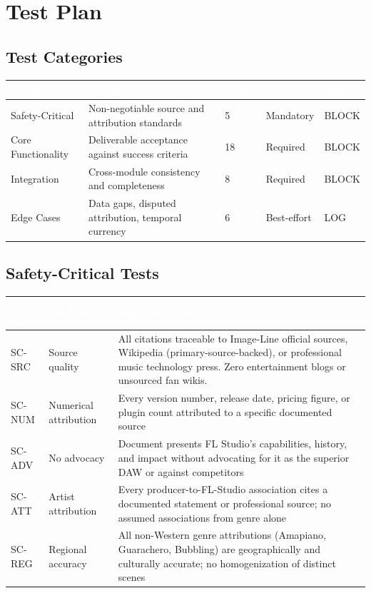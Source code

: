 \documentclass[11pt,letterpaper]{article}
\newcommand{\tableheader}[1]{\textbf{\sffamily\textcolor{white}{#1}}}
\begin{document}
\section{Test Plan}

\subsection{Test Categories}

\begin{center}
\begin{tabularx}{\textwidth}{L{3.5cm}XC{2cm}C{2cm}C{1.5cm}}
\toprule
{}
\tableheader{Category} & \tableheader{Purpose} & \tableheader{Count} & \tableheader{Priority} & \tableheader{Failure} \\
\midrule
Safety-Critical & Non-negotiable source and attribution standards & 5 & Mandatory & BLOCK \\
Core Functionality & Deliverable acceptance against success criteria & 18 & Required & BLOCK \\
Integration & Cross-module consistency and completeness & 8 & Required & BLOCK \\
Edge Cases & Data gaps, disputed attribution, temporal currency & 6 & Best-effort & LOG \\
\bottomrule
\end{tabularx}
\end{center}

\subsection{Safety-Critical Tests}

\begin{center}
\begin{tabularx}{\textwidth}{C{1.5cm}L{3.5cm}X}
\toprule
{}
\tableheader{Test ID} & \tableheader{Verifies} & \tableheader{Expected Behavior} \\
\midrule
SC-SRC & Source quality & All citations traceable to Image-Line official sources, Wikipedia (primary-source-backed), or professional music technology press. Zero entertainment blogs or unsourced fan wikis. \\
SC-NUM & Numerical attribution & Every version number, release date, pricing figure, or plugin count attributed to a specific documented source \\
SC-ADV & No advocacy & Document presents FL Studio's capabilities, history, and impact without advocating for it as the superior DAW or against competitors \\
SC-ATT & Artist attribution & Every producer-to-FL-Studio association cites a documented statement or professional source; no assumed associations from genre alone \\
SC-REG & Regional accuracy & All non-Western genre attributions (Amapiano, Guarachero, Bubbling) are geographically and culturally accurate; no homogenization of distinct scenes \\
\bottomrule
\end{tabularx}
\end{center}
\end{document}
